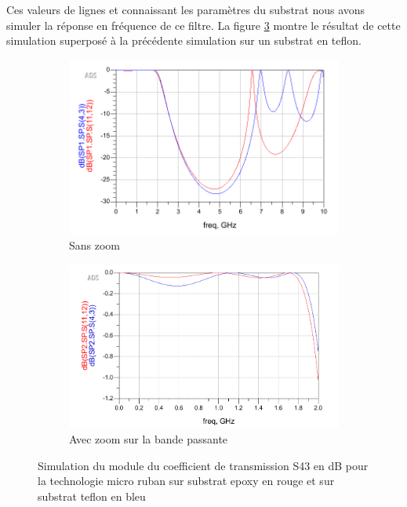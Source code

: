 \documentclass[french]{article}
\begin{document}
Ces valeurs de lignes et connaissant les paramètres du substrat nous avons simuler la réponse en fréquence de ce filtre. La figure \ref{fig:simu_comparaison_substrat} montre le résultat de cette simulation superposé à la précédente simulation sur un substrat en teflon.


\begin{figure}[H]
	\centering
	\begin{subfigure}[b]{0.49\textwidth}
		\includegraphics[width=\textwidth]{photo/passe_bas_vic/simu_comparaison_substrat.PNG}
		\caption{Sans zoom}
		\label{fig:simu_comparaison_substratG}
	\end{subfigure}
	\begin{subfigure}[b]{0.49\textwidth}
		\includegraphics[width=\textwidth]{photo/passe_bas_vic/simu_zoom_comparaison_substrat.PNG}
		\caption{Avec zoom sur la bande passante}
		\label{fig:simu_zoom_comparaison_substrat}
	\end{subfigure}
	\caption{Simulation du module du coefficient de transmission S43 en dB pour la technologie micro ruban sur substrat epoxy en rouge et sur substrat teflon en bleu}
	\label{fig:simu_comparaison_substrat}
\end{figure}
\end{document}
